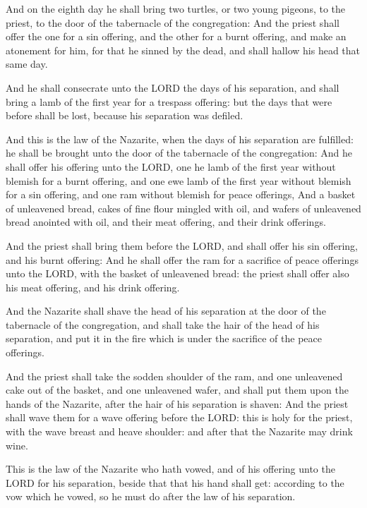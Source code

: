 \verse And on the eighth day he shall bring two turtles, or two young
pigeons, to the priest, to the door of the tabernacle of the
congregation: \verse And the priest shall offer the one for a sin
offering, and the other for a burnt offering, and make an atonement
for him, for that he sinned by the dead, and shall hallow his head
that same day.

\verse And he shall consecrate unto the LORD the days of his separation,
and shall bring a lamb of the first year for a trespass offering: but
the days that were before shall be lost, because his separation was
defiled.

\verse And this is the law of the Nazarite, when the days of his
separation are fulfilled: he shall be brought unto the door of the
tabernacle of the congregation: \verse And he shall offer his offering
unto the LORD, one he lamb of the first year without blemish for a
burnt offering, and one ewe lamb of the first year without blemish for
a sin offering, and one ram without blemish for peace offerings, \verse
And a basket of unleavened bread, cakes of fine flour mingled with
oil, and wafers of unleavened bread anointed with oil, and their meat
offering, and their drink offerings.

\verse And the priest shall bring them before the LORD, and shall offer
his sin offering, and his burnt offering: \verse And he shall offer the
ram for a sacrifice of peace offerings unto the LORD, with the basket
of unleavened bread: the priest shall offer also his meat offering,
and his drink offering.

\verse And the Nazarite shall shave the head of his separation at the
door of the tabernacle of the congregation, and shall take the hair of
the head of his separation, and put it in the fire which is under the
sacrifice of the peace offerings.

\verse And the priest shall take the sodden shoulder of the ram, and one
unleavened cake out of the basket, and one unleavened wafer, and shall
put them upon the hands of the Nazarite, after the hair of his
separation is shaven: \verse And the priest shall wave them for a wave
offering before the LORD: this is holy for the priest, with the wave
breast and heave shoulder: and after that the Nazarite may drink wine.

\verse This is the law of the Nazarite who hath vowed, and of his
offering unto the LORD for his separation, beside that that his hand
shall get: according to the vow which he vowed, so he must do after
the law of his separation.

